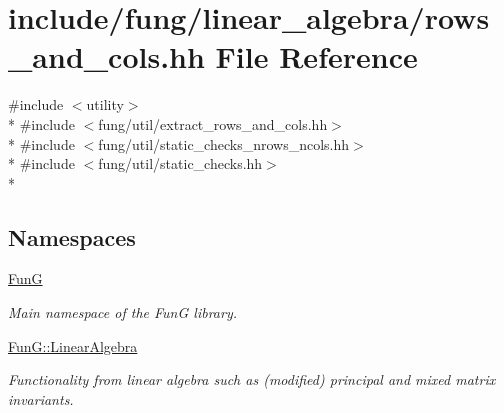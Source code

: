 \hypertarget{rows__and__cols_8hh}{}\section{include/fung/linear\+\_\+algebra/rows\+\_\+and\+\_\+cols.hh File Reference}
\label{rows__and__cols_8hh}
{\ttfamily \#include $<$utility$>$}\\*
{\ttfamily \#include $<$fung/util/extract\+\_\+rows\+\_\+and\+\_\+cols.\+hh$>$}\\*
{\ttfamily \#include $<$fung/util/static\+\_\+checks\+\_\+nrows\+\_\+ncols.\+hh$>$}\\*
{\ttfamily \#include $<$fung/util/static\+\_\+checks.\+hh$>$}\\*
\subsection*{Namespaces}
\begin{DoxyCompactItemize}
\item 
 \hyperlink{namespaceFunG}{FunG}
\begin{DoxyCompactList}\small\item\em Main namespace of the FunG library. \end{DoxyCompactList}\item 
 \hyperlink{namespaceFunG_1_1LinearAlgebra}{Fun\+G\+::\+Linear\+Algebra}
\begin{DoxyCompactList}\small\item\em Functionality from linear algebra such as (modified) principal and mixed matrix invariants. \end{DoxyCompactList}\end{DoxyCompactItemize}
